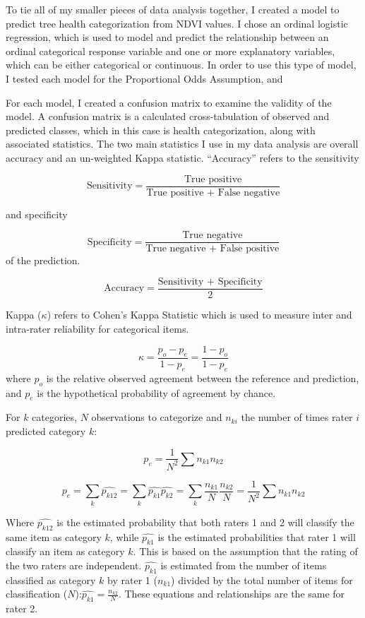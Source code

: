 \documentclass[12pt,twoside]{reedthesis}
\begin{document}
To tie all of my smaller pieces of data analysis together, I created a
model to predict tree health categorization from NDVI values. I chose an
ordinal logistic regression, which is used to model and predict the
relationship between an ordinal categorical response variable and one or
more explanatory variables, which can be either categorical or
continuous. In order to use this type of model, I tested each model for
the Proportional Odds Assumption, and

For each model, I created a confusion matrix to examine the validity of
the model. A confusion matrix is a calculated cross-tabulation of
observed and predicted classes, which in this case is health
categorization, along with associated statistics. The two main
statistics I use in my data analysis are overall accuracy and an
un-weighted Kappa statistic. ``Accuracy'' refers to the sensitivity

\[\textrm{Sensitivity}= \frac{\textrm{True positive}}{\textrm{True positive + False negative}}\]

and specificity

\[\textrm{Specificity}= \frac{\textrm{True negative}}{\textrm{True negative + False positive}}\]
of the prediction.

\[
\textrm{Accuracy}= \frac{\textrm{Sensitivity + Specificity}}{2}
\]

Kappa (\(\kappa\)) refers to Cohen's Kappa Statistic which is used to
measure inter and intra-rater reliability for categorical items.

\[
\kappa = \frac{p_o - p_e}{1 - p_e} = \frac{1 - p_o}{1 - p_e}
\] where \(p_o\) is the relative observed agreement between the reference
and prediction, and \(p_e\) is the hypothetical probability of agreement
by chance.

For \(k\) categories, \(N\) observations to categorize and \(n_{ki}\) the
number of times rater \(i\) predicted category \(k\):

\[
p_e = \frac{1}{N^2}\sum{n_{k1}n_{k2}}
\]

\[
p_e = \sum_{k}\widehat{p_{k12}} = \sum_{k} \widehat{p_{k1}}\widehat{p_{k2}} = \sum_{k}\frac{n_{k1}}{N}\frac{n_{k2}}{N} = \frac{1}{N^2}\sum{n_{k1}n_{k2}}
\]

Where \(\widehat{p_{k12}}\) is the estimated probability that both raters
1 and 2 will classify the same item as category \(k\), while
\(\widehat{p_{k1}}\) is the estimated probabilities that rater 1 will
classify an item as category \(k\). This is based on the assumption that
the rating of the two raters are independent. \(\widehat{p_{k1}}\) is
estimated from the number of items classified as category \(k\) by rater 1
(\(n_{k1}\)) divided by the total number of items for classification
(\(N\)):\(\widehat{p_{k1}}=\frac{n_{k2}}{N}\). These equations and
relationships are the same for rater 2.
\end{document}
